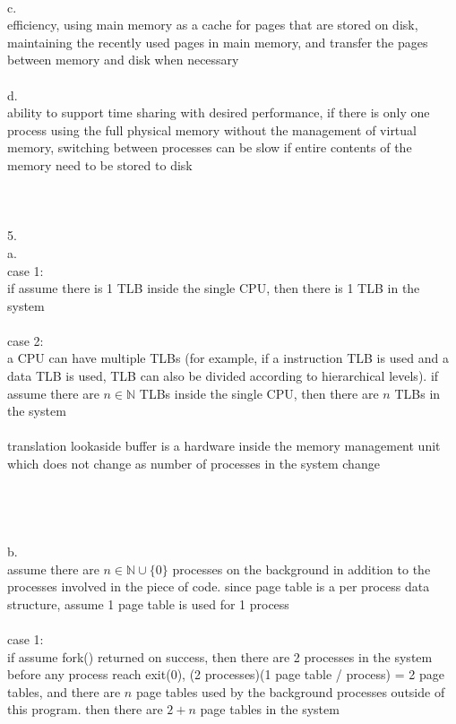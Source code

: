 \documentclass[12pt, border = 4pt, multi]{article} %
\begin{document}
\\
c.\\
efficiency, using main memory as a cache for pages that are stored on disk, maintaining the recently used pages in main memory, and transfer the pages between memory and disk when necessary\\
\\
d.\\
ability to support time sharing with desired performance, if there is only one process using the full physical memory without the management of virtual memory, switching between processes can be slow if entire contents of the memory need to be stored to disk\\
\\
\\
\\
5.\\
a.\\
case 1:\\
if assume there is 1 TLB inside the single CPU, then there is 1 TLB in the system\\
\\
case 2:\\
a CPU can have multiple TLBs (for example, if a instruction TLB is used and a data TLB is used, TLB can also be divided according to hierarchical levels). if assume there are $n \in \mathbb{N}$ TLBs inside the single CPU, then there are $n$ TLBs in the system\\
\\
translation lookaside buffer is a hardware inside the memory management unit which does not change as number of processes in the system change\\
\\
\\
\\
\\
b.\\
assume there are $n \in \mathbb{N} \cup \{0\}$ processes on the background in addition to the processes involved in the piece of code. since page table is a per process data structure, assume 1 page table is used for 1 process\\
\\
case 1:\\
if assume fork() returned on success, then there are 2 processes in the system before any process reach exit(0), (2 processes)(1 page table / process) = 2 page tables, and there are $n$ page tables used by the background processes outside of this program. then there are $2 + n$ page tables in the system\\
\end{document}
